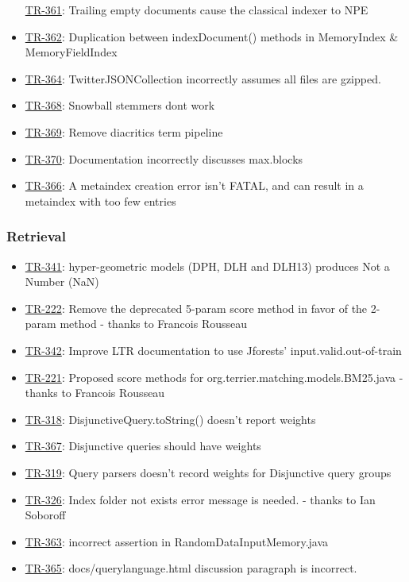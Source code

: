 \begin{itemize}
  \href{http://terrier.org/issues/browse/TR-361}{TR-361}: Trailing empty
  documents cause the classical indexer to NPE
\item
  \href{http://terrier.org/issues/browse/TR-362}{TR-362}: Duplication
  between indexDocument() methods in MemoryIndex \& MemoryFieldIndex
\item
  \href{http://terrier.org/issues/browse/TR-364}{TR-364}:
  TwitterJSONCollection incorrectly assumes all files are gzipped.
\item
  \href{http://terrier.org/issues/browse/TR-368}{TR-368}: Snowball
  stemmers dont work
\item
  \href{http://terrier.org/issues/browse/TR-369}{TR-369}: Remove
  diacritics term pipeline
\item
  \href{http://terrier.org/issues/browse/TR-370}{TR-370}: Documentation
  incorrectly discusses max.blocks
\item
  \href{http://terrier.org/issues/browse/TR-366}{TR-366}: A metaindex
  creation error isn't FATAL, and can result in a metaindex with too few
  entries
\end{itemize}

\subsubsection{Retrieval}\label{retrieval}

\begin{itemize}
\tightlist
\item
  \href{http://terrier.org/issues/browse/TR-341}{TR-341}:
  hyper-geometric models (DPH, DLH and DLH13) produces Not a Number
  (NaN)
\item
  \href{http://terrier.org/issues/browse/TR-222}{TR-222}: Remove the
  deprecated 5-param score method in favor of the 2-param method -
  thanks to Francois Rousseau
\item
  \href{http://terrier.org/issues/browse/TR-342}{TR-342}: Improve LTR
  documentation to use Jforests' input.valid.out-of-train
\item
  \href{http://terrier.org/issues/browse/TR-221}{TR-221}: Proposed score
  methods for org.terrier.matching.models.BM25.java - thanks to Francois
  Rousseau
\item
  \href{http://terrier.org/issues/browse/TR-318}{TR-318}:
  DisjunctiveQuery.toString() doesn't report weights
\item
  \href{http://terrier.org/issues/browse/TR-367}{TR-367}: Disjunctive
  queries should have weights
\item
  \href{http://terrier.org/issues/browse/TR-319}{TR-319}: Query parsers
  doesn't record weights for Disjunctive query groups
\item
  \href{http://terrier.org/issues/browse/TR-326}{TR-326}: Index folder
  not exists error message is needed. - thanks to Ian Soboroff
\item
  \href{http://terrier.org/issues/browse/TR-363}{TR-363}: incorrect
  assertion in RandomDataInputMemory.java
\item
  \href{http://terrier.org/issues/browse/TR-365}{TR-365}:
  docs/querylanguage.html discussion paragraph is incorrect.
\end{itemize}


